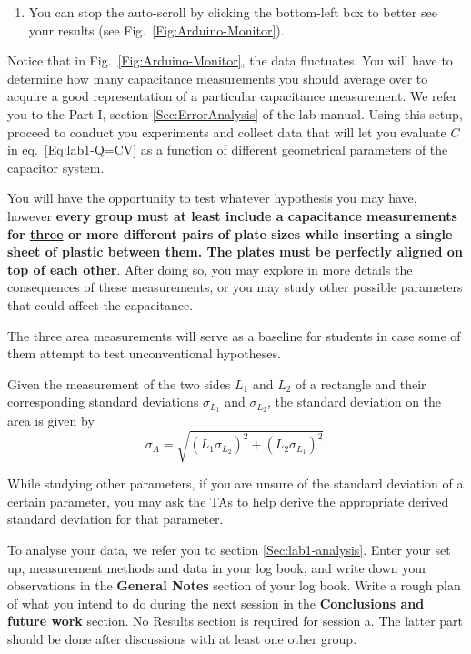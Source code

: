 \documentclass[12pt]{report}
\begin{document}
\begin{enumerate}
\item You can stop the auto-scroll by clicking the bottom-left box to better see your results (see Fig.~\ref{Fig:Arduino-Monitor}).
\end{enumerate}

Notice that in Fig.~\ref{Fig:Arduino-Monitor}, the data fluctuates. You will have to determine how many capacitance measurements  you should average over to acquire a good representation of a particular capacitance measurement. 
We refer you to the Part I, section \ref{Sec:ErrorAnalysis} of the lab manual. Using this setup, proceed to conduct you experiments and collect data that will let you evaluate $C$ in eq.~\eqref{Eq:lab1-Q=CV} as a function of different geometrical parameters of the capacitor system. 

You will have the opportunity to test whatever hypothesis you may have, however  \textbf{every group must at least include a capacitance measurements for \underline{three} or more different pairs of plate sizes while inserting a single sheet of plastic between them. 
The plates must be perfectly aligned on top of each other}. After doing so, you may explore in more details the consequences of these measurements, or you may study other possible parameters that could affect the capacitance.

\begin{tcolorbox}
The three area measurements will serve as a baseline for students in case some of them attempt to test unconventional hypotheses. 
\end{tcolorbox}

Given the measurement of the two sides $L_1$ and $L_2$ of a rectangle and their corresponding standard deviations $\sigma_{L_1}$ and $\sigma_{L_2}$, the standard deviation on the area is given by
\begin{equation}
\sigma_A = \sqrt{ \left( L_1 \sigma_{L_2} \right)^2 + \left( L_2 \sigma_{L_1} \right)^2 }.
\end{equation}

While studying other parameters, if you are unsure of the standard deviation of a certain parameter, you may ask the TAs to help derive the appropriate derived standard deviation for that parameter.

To analyse your data, we refer you to section \ref{Sec:lab1-analysis}.
{\color{blue}Enter your set up, measurement methods and data in your log book, and write down your observations in the \textbf{General Notes} section of your log book. Write  a rough plan of what you intend to do during the next session in the \textbf{Conclusions and future work} section. No Results section is required for session a}. The latter part should be done after discussions with at least one other group.
\end{document}
